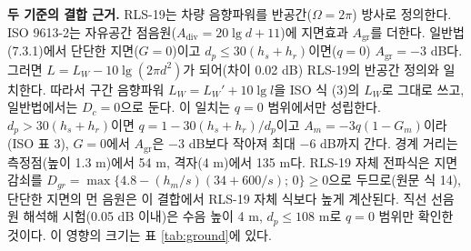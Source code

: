 \documentclass[10.5pt,a4paper]{article}
\begin{document}
\textbf{두 기준의 결합 근거.} RLS-19는 차량 음향파워를 반공간($\Omega = 2\pi$) 방사로 정의한다. ISO 9613-2는 자유공간 점음원($A_{\mathrm{div}} = 20\lg d + 11$)에 지면효과 $A_{\mathrm{gr}}$를 더한다. 일반법(7.3.1)에서 단단한 지면($G=0$)이고 $d_p \le 30(h_s+h_r)$이면($q=0$) $A_{\mathrm{gr}} = -3$ dB다. 그러면 $L = L_W - 10\lg(2\pi d^2)$가 되어(차이 0.02 dB) RLS-19의 반공간 정의와 일치한다. 따라서 구간 음향파워 $L_W = L_W' + 10\lg l$을 ISO 식 (3)의 $L_W$로 그대로 쓰고, 일반법에서는 $D_c = 0$으로 둔다. 이 일치는 $q = 0$ 범위에서만 성립한다. $d_p > 30(h_s+h_r)$이면 $q = 1 - 30(h_s+h_r)/d_p$이고 $A_m = -3q(1-G_m)$이라(ISO 표 3), $G = 0$에서 $A_{\mathrm{gr}}$은 $-3$ dB보다 작아져 최대 $-6$ dB까지 간다. 경계 거리는 측정점(높이 1.3 m)에서 54 m, 격자(4 m)에서 135 m다. RLS-19 자체 전파식은 지면 감쇠를 $D_{gr} = \max\{4.8 - (h_m/s)(34 + 600/s);\,0\} \ge 0$으로 두므로(원문 식 14), 단단한 지면의 먼 음원은 이 결합에서 RLS-19 자체 식보다 높게 계산된다. 직선 선음원 해석해 시험(0.05 dB 이내)은 수음 높이 4 m, $d_p \le 108$ m로 $q = 0$ 범위만 확인한 것이다. 이 영향의 크기는 표 \ref{tab:ground}에 있다.
\end{document}
